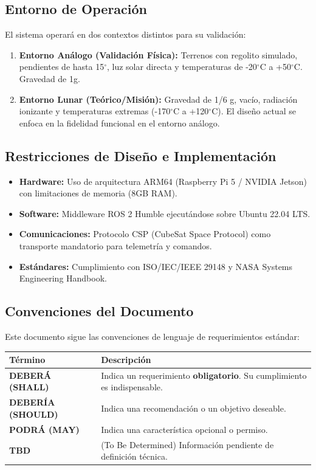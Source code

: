 \subsection{Entorno de Operación}
El sistema operará en dos contextos distintos para su validación:
\begin{enumerate}
    \item \textbf{Entorno Análogo (Validación Física):} Terrenos con regolito simulado, pendientes de hasta 15$^\circ$, luz solar directa y temperaturas de -20$^\circ$C a +50$^\circ$C. Gravedad de 1g.
    \item \textbf{Entorno Lunar (Teórico/Misión):} Gravedad de 1/6 g, vacío, radiación ionizante y temperaturas extremas (-170$^\circ$C a +120$^\circ$C). El diseño actual se enfoca en la fidelidad funcional en el entorno análogo.
\end{enumerate}

\subsection{Restricciones de Diseño e Implementación}
\begin{itemize}
    \item \textbf{Hardware:} Uso de arquitectura ARM64 (Raspberry Pi 5 / NVIDIA Jetson) con limitaciones de memoria (8GB RAM).
    \item \textbf{Software:} Middleware ROS 2 Humble ejecutándose sobre Ubuntu 22.04 LTS.
    \item \textbf{Comunicaciones:} Protocolo CSP (CubeSat Space Protocol) como transporte mandatorio para telemetría y comandos.
    \item \textbf{Estándares:} Cumplimiento con ISO/IEC/IEEE 29148 y NASA Systems Engineering Handbook.
\end{itemize}

\subsection{Convenciones del Documento}
Este documento sigue las convenciones de lenguaje de requerimientos estándar:
\begin{table}[H]
    \centering
    \begin{tabularx}{\textwidth}{|l|X|}
        \hline
        \rowcolor{AgencyBlue!10} \textbf{Término} & \textbf{Descripción} \\ \hline
        \textbf{DEBERÁ (SHALL)} & Indica un requerimiento \textbf{obligatorio}. Su cumplimiento es indispensable. \\ \hline
        \textbf{DEBERÍA (SHOULD)} & Indica una recomendación o un objetivo deseable. \\ \hline
        \textbf{PODRÁ (MAY)} & Indica una característica opcional o permiso. \\ \hline
        \textbf{TBD} & (To Be Determined) Información pendiente de definición técnica. \\ \hline
    \end{tabularx}
\end{table}


